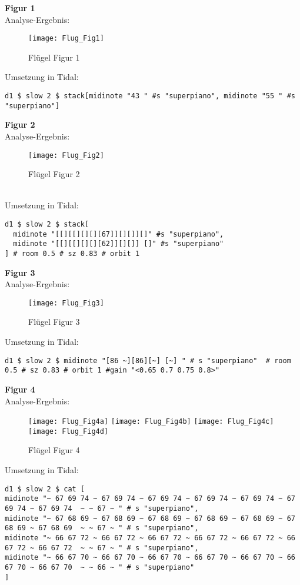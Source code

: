 \documentclass[
10pt, %
a4paper, %
oneside, %
headinclude,footinclude, %
BCOR5mm, %
]{scrartcl}
\begin{document}
\noindent\textbf{Figur 1}\\
Analyse-Ergebnis:
\begin{figure}[h]
	\centering 
	\texttt{[image: Flug\_Fig1]} 
	\caption{Flügel Figur 1}
\end{figure}
\noindent Umsetzung in Tidal:
\begin{lstlisting}
d1 $ slow 2 $ stack[midinote "43 " #s "superpiano", midinote "55 " #s "superpiano"]
\end{lstlisting}

\noindent \textbf{Figur 2}\\
Analyse-Ergebnis:
\begin{figure}[h]
	\centering 
	\texttt{[image: Flug\_Fig2]} 
	\caption{Flügel Figur 2}
\end{figure}\\
\noindent Umsetzung in Tidal:
\begin{lstlisting}
d1 $ slow 2 $ stack[
  midinote "[[][[][][][67]][][]][]" #s "superpiano",
  midinote "[[][[][][][62]][][]] []" #s "superpiano"
] # room 0.5 # sz 0.83 # orbit 1
\end{lstlisting}

\noindent \textbf{Figur 3}\\
Analyse-Ergebnis:
\begin{figure}[h]
	\centering 
	\texttt{[image: Flug\_Fig3]} 
	\caption{Flügel Figur 3}
\end{figure}

\noindent Umsetzung in Tidal:
\begin{lstlisting}
d1 $ slow 2 $ midinote "[86 ~][86][~] [~] " # s "superpiano"  # room 0.5 # sz 0.83 # orbit 1 #gain "<0.65 0.7 0.75 0.8>"
\end{lstlisting}


\noindent \textbf{Figur 4}\\
Analyse-Ergebnis:
\begin{figure}[h]
	\centering 
	\texttt{[image: Flug\_Fig4a]} 
	\texttt{[image: Flug\_Fig4b]} 
	\texttt{[image: Flug\_Fig4c]} 
	\texttt{[image: Flug\_Fig4d]} 
	\caption{Flügel Figur 4}
\end{figure}

\noindent Umsetzung in Tidal:
\begin{lstlisting}
d1 $ slow 2 $ cat [
midinote "~ 67 69 74 ~ 67 69 74 ~ 67 69 74 ~ 67 69 74 ~ 67 69 74 ~ 67 69 74 ~ 67 69 74  ~ ~ 67 ~ " # s "superpiano",
midinote "~ 67 68 69 ~ 67 68 69 ~ 67 68 69 ~ 67 68 69 ~ 67 68 69 ~ 67 68 69 ~ 67 68 69  ~ ~ 67 ~ " # s "superpiano",
midinote "~ 66 67 72 ~ 66 67 72 ~ 66 67 72 ~ 66 67 72 ~ 66 67 72 ~ 66 67 72 ~ 66 67 72  ~ ~ 67 ~ " # s "superpiano",
midinote "~ 66 67 70 ~ 66 67 70 ~ 66 67 70 ~ 66 67 70 ~ 66 67 70 ~ 66 67 70 ~ 66 67 70  ~ ~ 66 ~ " # s "superpiano"
]
\end{lstlisting}
\end{document}
